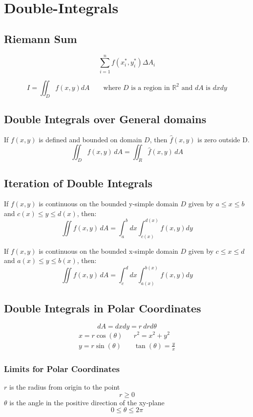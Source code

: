 \section{Double-Integrals}
\subsection{Riemann Sum}
$$\sum_{i=1}^n f(x_i^*, y_i^*) \Delta A_i$$

\[
  I=\iint_D f(x,y) dA\quad \quad \text{where } D \text{ is a region in } \mathbb{R}^2 \text{ and } dA \text{ is }dxdy
\]

\subsection{Double Integrals over General domains}
If $f(x,y)$ is defined and bounded on domain $D$, then $\hat{f}(x,y)$ is zero outside D.
$$\iint_{D}f(x,y)\,d A=\iint_{R}{\hat{f}}(x,y)\,d A$$

\subsection{Iteration of Double Integrals}
If $f(x,y)$ is continuous on the bounded y-simple domain $D$ given by $a\leq x\leq b$ and $c(x)\leq y\leq d(x)$, then:
$$\iint f(x,y)\,d A=\int_a^b dx \int_{c(x)}^{d(x)}f(x,y)dy$$

If $f(x,y)$ is continuous on the bounded x-simple domain $D$ given by $c\leq x\leq d$ and $a(x)\leq y\leq b(x)$, then:
$$\iint f(x,y)\,d A=\int_c^d dx \int_{a(x)}^{b(x)}f(x,y)dy$$
\subsection{Double Integrals in Polar Coordinates}
$$dA=dxdy = r\ dr d\theta$$
$$\begin{array}{lll}
  x=r\cos(\theta)&&r^2=x^2+y^2\\
  y=r\sin(\theta)&&\tan(\theta)=\frac{y}{x}
\end{array}$$
\subsubsection{Limits for Polar Coordinates}
$r$ is the radius from origin to the point
$$r\geq 0$$
$\theta$ is the angle in the positive direction of the xy-plane
$$0\leq\theta \leq 2\pi$$

